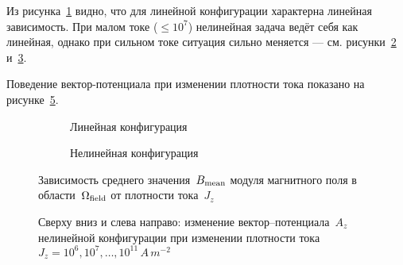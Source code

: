 Из рисунка~\ref{bj:linear} видно, что для линейной конфигурации характерна линейная зависимость. При малом токе ($\le 10^7$) нелинейная задача ведёт себя как линейная, однако при сильном токе ситуация сильно меняется --- см. рисунки~\ref{bj:nonlinear} и~\ref{bj:both}.

Поведение вектор-потенциала при изменении плотности тока показано на рисунке~\ref{fig:a_nonlinear}.

\vfill

\begin{figure}[h]
	\centering
	\begin{subfigure}{.45\linewidth}
		\centering
		\caption{Линейная конфигурация}
		\label{bj:linear}
	\end{subfigure}%
	\hfill
	\begin{subfigure}{.45\linewidth}
		\centering
		\caption{Нелинейная конфигурация}
		\label{bj:nonlinear}
	\end{subfigure}%
	\par\bigskip
	\begin{subfigure}{.7\linewidth}
		\centering
		\caption{}
		\label{bj:both}
	\end{subfigure}%
	\caption{
		Зависимость среднего значения~${B_{\text{mean}}}$ модуля магнитного поля в области~${\Omega_{\text{field}}}$ от плотности тока~$J_z$
	}
	\label{fig:bj}
\end{figure}

\vfill

\clearpage

\vfill

\begin{figure}
	\centering
	\begin{subfigure}{.47\linewidth}
		\centering
	\end{subfigure}%
	\hfill
	\begin{subfigure}{.47\linewidth}
		\centering
	\end{subfigure}%
	\par\bigskip
	\begin{subfigure}{.47\linewidth}
		\centering
	\end{subfigure}%
	\hfill
	\begin{subfigure}{.47\linewidth}
		\centering
	\end{subfigure}%
	\par\bigskip
	\begin{subfigure}{.47\linewidth}
		\centering
	\end{subfigure}%
	\hfill
	\begin{subfigure}{.47\linewidth}
		\centering
	\end{subfigure}
	\caption[Изменение вектор--потенциала~$A_z$ нелинейной конфигурации при изменении плотности тока~$J_z$]{
		Сверху вниз и слева направо: изменение вектор--потенциала~$A_z$ нелинейной конфигурации при изменении плотности тока~${J_z = 10^6, 10^7, \dots, 10^{11}\,A\,m^{-2}}$
	}
	\label{fig:a_nonlinear}
\end{figure}

